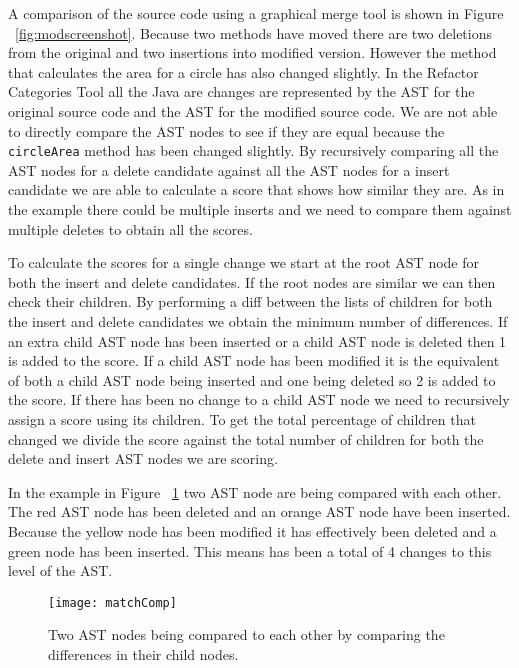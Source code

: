 A comparison of the source code using a graphical merge tool is shown in Figure ~\ref{fig:modscreenshot}.  Because two methods have moved there are two deletions from the original and two insertions into modified version.  However the method that calculates the area for a circle has also changed slightly. In the Refactor Categories Tool all the Java are changes are represented by the AST for the original source code and the AST for the modified source code. We are not able to directly compare the AST nodes to see if they are equal because the \lstinline{circleArea} method has been changed slightly. By recursively comparing all the AST nodes for a delete candidate against all the AST nodes for a insert candidate we are able to calculate a score that shows how similar they are.  As in the example there could be multiple inserts and we need to compare them against multiple deletes to obtain all the scores.

To calculate the scores for a single change we start at the root AST node for both the insert and delete candidates.  If the root nodes are similar we can then check their children. By performing a diff between the lists of children for both the insert and delete candidates we obtain the minimum number of differences.  If an extra child AST node has been inserted or a child AST node is deleted then 1 is added to the score. If a child AST node has been modified it is the equivalent of both a child AST node being inserted and one being deleted so 2 is added to the score. If there has been no change to a child AST node we need to recursively assign a score using its children. To get the total percentage of children that changed we divide the score against the total number of children for both the delete and insert AST nodes we are scoring.

In the example in Figure ~\ref{fig:matchComp} two AST node are being compared with each other. The red AST node has been deleted and an orange AST node have been inserted. Because the yellow node has been modified it has effectively been deleted and a green node has been inserted. This means has been a total of 4 changes to this level of the AST. 

\begin{figure}[!t]
 \begin{center}
 \texttt{[image: matchComp]}
 \end{center}
 \caption{Two AST nodes being compared to each other by comparing the differences in their child nodes.}
 \label{fig:matchComp}
\end{figure}

